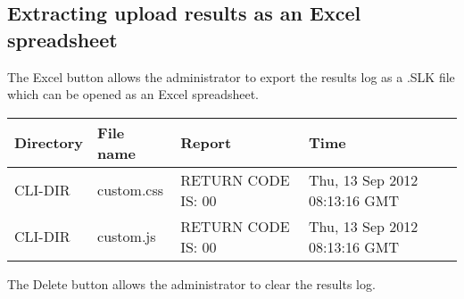 \documentclass[letterpaper,10pt,english]{sphinxmanual}
\begin{document}


\ignorespaces 

\subsection{Extracting upload results as an Excel spreadsheet}
\label{\detokenize{audit_operations_ and_performance:extracting-upload-results-as-an-excel-spreadsheet}}\label{\detokenize{audit_operations_ and_performance:index-61}}
 The Excel button allows the administrator to export the results log as a .SLK file which can be opened as an Excel spreadsheet.


\begin{savenotes}\sphinxattablestart
\centering
\begin{tabulary}{\linewidth}[t]{|T|T|T|T|}
\hline
\sphinxstyletheadfamily 
Directory
&\sphinxstyletheadfamily 
File name
&\sphinxstyletheadfamily 
Report
&\sphinxstyletheadfamily 
Time
\\
\hline
CLI-DIR
&
custom.css
&
RETURN CODE IS: 00
&
Thu, 13 Sep 2012 08:13:16 GMT
\\
\hline
CLI-DIR
&
custom.js
&
RETURN CODE IS: 00
&
Thu, 13 Sep 2012 08:13:16 GMT
\\
\hline
\end{tabulary}
\par
\sphinxattableend\end{savenotes}

 The Delete button allows the administrator to clear the results log.
\begin{quote}

\ignorespaces 
{}\ignorespaces \end{quote}
\end{document}
